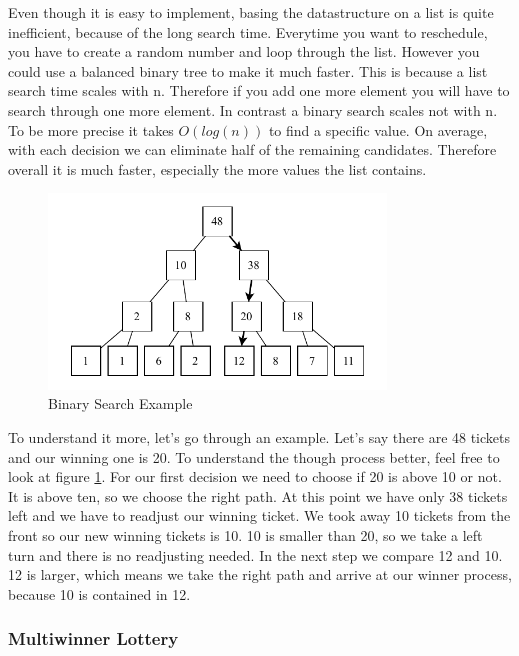Even though it is easy to implement, basing the datastructure on a list is quite inefficient, because of the long search time.
Everytime you want to reschedule, you have to create a random number and loop through the list.
However you could use a balanced binary tree to make it much faster.
This is because a list search time scales with n. 
Therefore if you add one more element you will have to search through one more element.
In contrast a binary search scales not with n.
To be more precise it takes $O(log(n))$ to find a specific value.
On average, with each decision we can eliminate half of the remaining candidates.
Therefore overall it is much faster, especially the more values the list contains.

\begin{figure}[h]
    \centering
    \includegraphics[width=0.8\textwidth]{Assets/Binary-Search.pdf}
    \caption{Binary Search Example}
    \label{fig:binary-search}
\end{figure}

To understand it more, let's go through an example. Let's say there are 48 tickets and our winning one is 20.
To understand the though process better, feel free to look at figure \ref{fig:binary-search}.
For our first decision we need to choose if 20 is above 10 or not.
It is above ten, so we choose the right path.
At this point we have only 38 tickets left and we have to readjust our winning ticket.
We took away 10 tickets from the front so our new winning tickets is 10.
10 is smaller than 20, so we take a left turn and there is no readjusting needed.
In the next step we compare 12 and 10.
12 is larger, which means we take the right path and arrive at our winner process, because 10 is contained in 12.

\subsubsection{Multiwinner Lottery}

